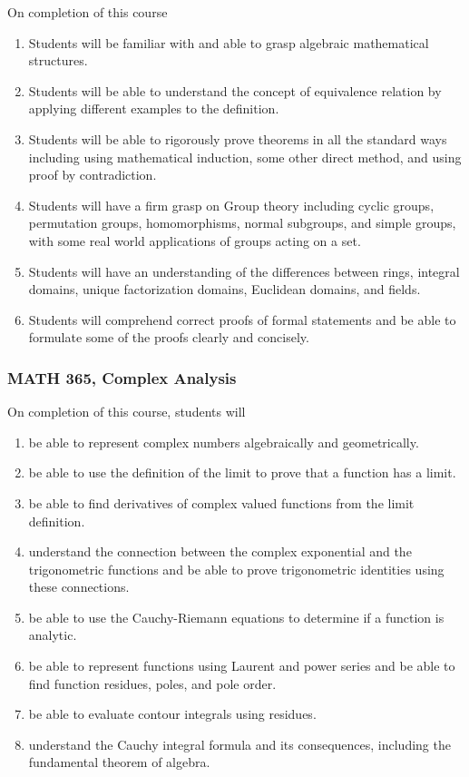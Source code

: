 \documentclass[11pt]{article}
\newenvironment{alphalist}{
\begin{enumerate}[label=(\arabic*),widest=107 ,leftmargin=25pt, itemsep=0pt]}
{\end{enumerate}}
\begin{document}
On completion of this course
\begin{alphalist}
\item Students will be familiar with and able to grasp algebraic mathematical structures.
\item Students will be able to understand the concept of equivalence relation by applying different examples to the definition.
\item Students will be able to rigorously prove theorems in all the standard ways including using mathematical induction, some other direct method, and using proof by contradiction.
\item Students will have a firm grasp on Group theory including cyclic groups, permutation groups, homomorphisms, normal subgroups, and simple groups, with some real world applications of groups acting on a set. 
\item Students will have an understanding of the differences between rings, integral domains, unique factorization domains, Euclidean domains, and fields.
\item Students will comprehend correct proofs of formal statements and be able to formulate some of the proofs clearly and concisely.
\end{alphalist}

\subsubsection{MATH 365, Complex Analysis}

On completion of this course, students will 
\begin{alphalist}
    \item be able to represent complex numbers algebraically and geometrically.
    \item be able to use the definition of the limit to prove that a function has a limit.
    \item be able to find derivatives of complex valued functions from the limit definition.
    \item understand the connection between the complex exponential and the trigonometric functions and be able to 
        prove trigonometric identities using these connections.
    \item be able to use the Cauchy-Riemann equations to determine if a function is 
          analytic.
    \item be able to represent functions using Laurent and power series and be able 
           to find function residues, poles, and pole order.
    \item be able to evaluate contour integrals using residues.
    \item understand the Cauchy integral formula and its consequences,  including the 
       fundamental theorem of algebra.
\end{alphalist}
\end{document}
